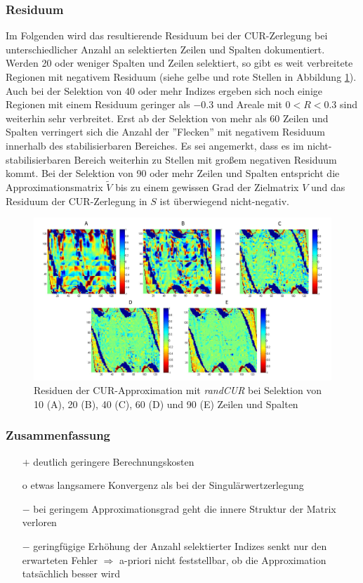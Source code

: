 \documentclass[12pt,a4paper,twoside]{article}
\begin{document}
\subsubsection*{Residuum}
Im Folgenden wird das resultierende Residuum bei der CUR-Zerlegung bei unterschiedlicher Anzahl an selektierten Zeilen und Spalten dokumentiert. \\
Werden 20 oder weniger Spalten und Zeilen selektiert, so gibt es weit verbreitete Regionen mit negativem Residuum (siehe gelbe und rote Stellen in Abbildung \ref{pic:randcur_res}). Auch bei der Selektion von 40 oder mehr Indizes ergeben sich noch einige Regionen mit einem Residuum geringer als $-0.3$ und Areale mit $0<R<0.3$ sind weiterhin sehr verbreitet. Erst ab der Selektion von mehr als 60 Zeilen und Spalten verringert sich die Anzahl der ''Flecken'' mit negativem Residuum innerhalb des stabilisierbaren Bereiches. Es sei angemerkt, dass es im nicht-stabilisierbaren Bereich weiterhin zu Stellen mit großem negativen Residuum kommt. Bei der Selektion von 90 oder mehr Zeilen und Spalten entspricht die Approximationsmatrix $\tilde{V}$ bis zu einem gewissen Grad der Zielmatrix $V$ und das Residuum der CUR-Zerlegung in $S$ ist überwiegend nicht-negativ.
\begin{figure}[h]
	\center
	\includegraphics[scale=0.4]{randCUR_res2}
	\caption{\label{pic:randcur_res}Residuen der CUR-Approximation mit \textit{randCUR} bei Selektion von 10 (A), 20 (B), 40 (C), 60 (D) und 90 (E) Zeilen und Spalten}
\end{figure}
\subsubsection*{Zusammenfassung}
\begin{itemize}
	\item[$+$] deutlich geringere Berechnungskosten
	\item[o] etwas langsamere Konvergenz als bei der Singulärwertzerlegung
	\item[$-$] bei geringem Approximationsgrad geht die innere Struktur der Matrix verloren
	\item[$-$] geringfügige Erhöhung der Anzahl selektierter Indizes senkt nur den erwarteten Fehler $\Rightarrow$ a-priori nicht feststellbar, ob die Approximation tatsächlich besser wird
\end{itemize}
\newpage
\end{document}
